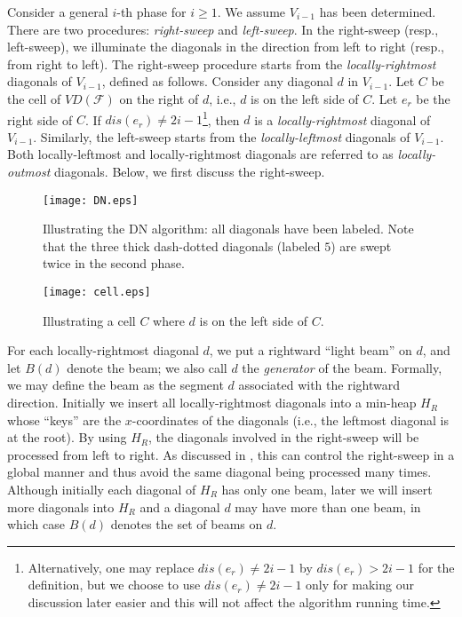 \documentclass[english,runningheads,11pt]{llncs-revised}
\def\calF{\mathcal{F}}
\newcommand{\vtd}{\mbox{$V\!D$}}
\begin{document}
Consider a general $i$-th phase for $i\geq 1$.
We assume $V_{i-1}$ has been determined. There are
two procedures: {\em right-sweep} and {\em left-sweep}. In the
right-sweep (resp., left-sweep), we illuminate the diagonals in the direction
from left to right (resp., from right to left).
The right-sweep procedure starts from the
{\em locally-rightmost} diagonals of $V_{i-1}$, defined as follows.
Consider any diagonal $d$ in $V_{i-1}$. Let $C$ be the cell of $\vtd(\calF)$ on the
right of $d$, i.e., $d$ is on the left side of $C$.
Let $e_r$ be the right side of $C$. If $dis(e_r)\neq 2i-1$\footnote{
Alternatively, one may replace $dis(e_r)\neq 2i-1$ by $dis(e_r)>2i-1$
for the definition, but we choose to use $dis(e_r)\neq 2i-1$ only for
making our discussion later easier and this will not affect the
algorithm running time.}, then $d$ is a {\em locally-rightmost} diagonal of $V_{i-1}$.
Similarly, the left-sweep starts from the {\em
locally-leftmost} diagonals of $V_{i-1}$. Both
locally-leftmost and locally-rightmost diagonals are referred to as
{\em locally-outmost} diagonals. Below, we first discuss the
right-sweep.

\begin{figure}[t]
\begin{minipage}[t]{0.60\linewidth}
\begin{center}
\texttt{[image: DN.eps]}
\caption{\footnotesize Illustrating the DN algorithm: all diagonals
have been labeled. Note that the three thick dash-dotted diagonals
(labeled $5$) are swept twice in the second phase.}
\label{fig:DN}
\end{center}
\end{minipage}
\hspace*{0.05in}
\begin{minipage}[t]{0.38\linewidth}
\begin{center}
\texttt{[image: cell.eps]}
\caption{\footnotesize Illustrating a cell $C$ where $d$ is on the
left side of $C$.}
\label{fig:cell}
\end{center}
\end{minipage}
\vspace{-0.15in}
\end{figure}

For each
locally-rightmost diagonal $d$, we put a rightward ``light beam'' on
$d$, and let $B(d)$ denote the beam;
we also call $d$ the {\em generator} of the beam.
Formally, we may define the beam as the segment $d$ associated with the rightward
direction. Initially we insert all locally-rightmost
diagonals into a min-heap $H_R$ whose ``keys'' are the $x$-coordinates of the
diagonals (i.e., the leftmost diagonal is at the root).
By using $H_R$, the diagonals involved in the right-sweep will be processed from left to
right. As discussed in \cite{ref:DasGe91}, this can control the
right-sweep in a global manner and thus avoid the same
diagonal being processed many times.
Although initially each diagonal of $H_R$ has only one
beam, later we will insert more diagonals into $H_R$ and a
diagonal $d$ may have more than one beam,
in which case $B(d)$ denotes the set of beams on $d$.
\end{document}
